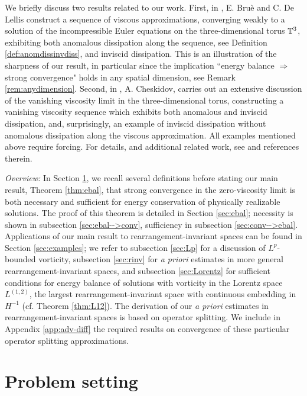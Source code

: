 \documentclass[reqno,12pt]{amsart}
\begin{document}
We briefly discuss two results related to our work. First, in \cite{BD2022}, E. Bru\`{e} and C. De Lellis construct a sequence of viscous approximations, converging weakly to a solution of the incompressible Euler equations on the three-dimensional torus $\mathbb{T}^3$, exhibiting both anomalous dissipation along the sequence, see Definition \ref{def:anomdissinvdiss}, and inviscid dissipation. This is an illustration of the sharpness of our result, in particular since the implication ``energy balance $\Longrightarrow$ strong convergence" holds in any spatial dimension, see Remark \ref{rem:anydimension}. Second, in \cite{Cheskidov23}, A. Cheskidov, carries out an extensive discussion of the vanishing viscosity limit in the three-dimensional torus, constructing a vanishing viscosity sequence which exhibits both anomalous and inviscid dissipation, and, surprisingly, an example of inviscid dissipation without anomalous dissipation along the viscous approximation. All examples mentioned above require forcing. For details, and additional related work, see \cite{BD2022,Cheskidov23} and references therein.

\emph{Overview:} In Section \ref{sec:probsetting}, we recall several definitions before stating our main result, Theorem \ref{thm:ebal}, that strong convergence in the zero-viscosity limit is both necessary and sufficient for energy conservation of physically realizable solutions. The proof of this theorem is detailed in Section \ref{sec:ebal};  necessity is shown in subsection \ref{sec:ebal-->conv}, sufficiency in subsection \ref{sec:conv-->ebal}. Applications of our main result to rearrangement-invariant spaces can be found in Section \ref{sec:examples}; we refer to subsection \ref{sec:Lp} for a discussion of $L^p$-bounded vorticity, subsection \ref{sec:rinv} for {\it a priori} estimates in more general rearrangement-invariant spaces, and subsection \ref{sec:Lorentz} for sufficient conditions for energy balance of solutions with vorticity in the Lorentz space $L^{(1,2)}$, the largest rearrangement-invariant space with continuous embedding in $H^{-1}$ (cf. Theorem \ref{thm:L12}).
The derivation of our {\it a priori} estimates in rearrangement-invariant spaces is based on operator splitting. We include in Appendix \ref{app:adv-diff} the required results on convergence of these particular operator splitting approximations.



\section{Problem setting}
\label{sec:probsetting}
\end{document}
